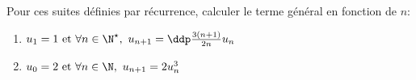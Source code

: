 
\begin{exercice} \;
Pour ces suites d\'efinies par r\'ecurrence, calculer le terme g\'en\'eral en fonction de $n$:
\begin{enumerate}
\item 
$u_1=1\ \hbox{et}\ \forall n\in\N^{\star},\ u_{n+1}=\ddp\frac{3(n+1)}{2n}u_n$
\item 
$u_0=2\ \hbox{et}\ \forall n\in\N,\ u_{n+1}=2u_n^3$
\end{enumerate}
\end{exercice}